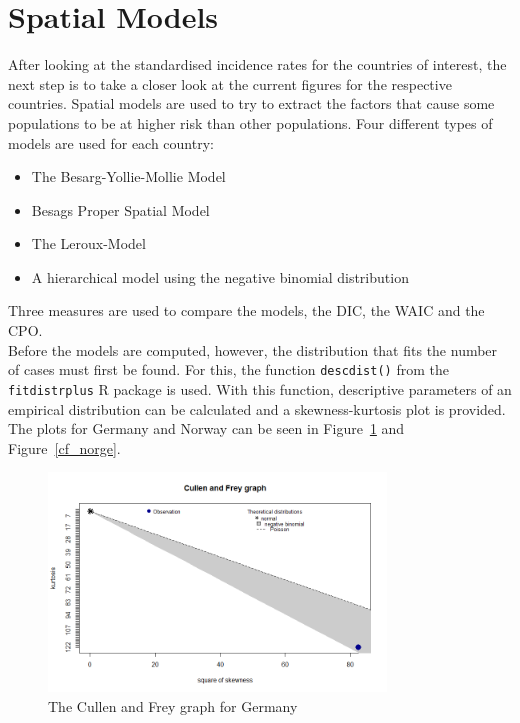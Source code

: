\section{Spatial Models}
After looking at the standardised incidence rates for the countries of interest, the next step is to take a closer look at the current figures for the respective countries. Spatial models are used to try to extract the factors that cause some populations to be at higher risk than other populations. Four different types of models are used for each country:
\begin{itemize}
    \item[1.] The Besarg-Yollie-Mollie Model
    \item[2.] Besags Proper Spatial Model
    \item[3.] The Leroux-Model
    \item[4.] A hierarchical model using the negative binomial distribution
\end{itemize}
Three measures are used to compare the models, the DIC, the WAIC and the CPO. \\
Before the models are computed, however, the distribution that fits the number of cases must first be found. For this, the function \texttt{descdist()} from the \texttt{fitdistrplus} R package is used. With this function, descriptive parameters of an empirical distribution can be calculated and a skewness-kurtosis plot is provided. The plots for Germany and Norway can be seen in Figure~\ref{cf_germany} and Figure~\ref{cf_norge}.
%     
\begin{figure}[H]
    \centering
    \includegraphics[width = 0.8\textwidth]{cf-germany.png}
    \caption{The Cullen and Frey graph for Germany}
    \label{cf_germany}
\end{figure}

